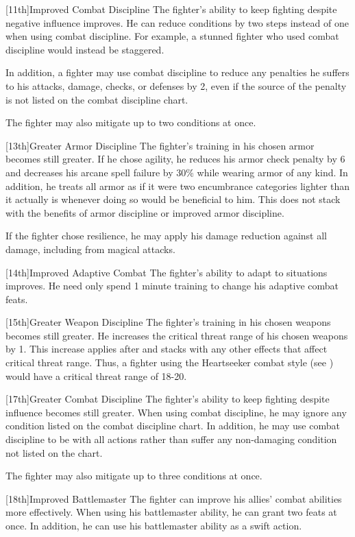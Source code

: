 [11th]{Improved Combat Discipline}
The fighter's ability to keep fighting despite negative influence improves.
He can reduce conditions by two steps instead of one when using combat discipline.
For example, a stunned fighter who used combat discipline would instead be staggered.
\par In addition, a fighter may use combat discipline to reduce any penalties he suffers to his attacks, damage, checks, or defenses by 2, even if the source of the penalty is not listed on the combat discipline chart.
\par The fighter may also mitigate up to two conditions at once.

[13th]{Greater Armor Discipline}
The fighter's training in his chosen armor becomes still greater.
If he chose agility, he reduces his armor check penalty by 6 and decreases his arcane spell failure by 30\% while wearing armor of any kind.
In addition, he treats all armor as if it were two encumbrance categories lighter than it actually is whenever doing so would be beneficial to him.
This does not stack with the benefits of armor discipline or improved armor discipline.

If the fighter chose resilience, he may apply his damage reduction against all damage, including from magical attacks.

[14th]{Improved Adaptive Combat}
The fighter's ability to adapt to situations improves.
He need only spend 1 minute training to change his adaptive combat feats.

[15th]{Greater Weapon Discipline}
The fighter's training in his chosen weapons becomes still greater.
He increases the critical threat range of his chosen weapons by 1.
This increase applies after and stacks with any other effects that affect critical threat range.
Thus, a fighter using the Heartseeker combat style (see ) would have a critical threat range of 18-20.

[17th]{Greater Combat Discipline}
The fighter's ability to keep fighting despite influence becomes still greater.
When using combat discipline, he may ignore any condition listed on the combat discipline chart.
In addition, he may use combat discipline to be \severelyimpaired with all actions rather than suffer any non-damaging condition not listed on the chart.

\par The fighter may also mitigate up to three conditions at once.

[18th]{Improved Battlemaster}
The fighter can improve his allies' combat abilities more effectively.
When using his battlemaster ability, he can grant two feats at once.
In addition, he can use his battlemaster ability as a swift action.

